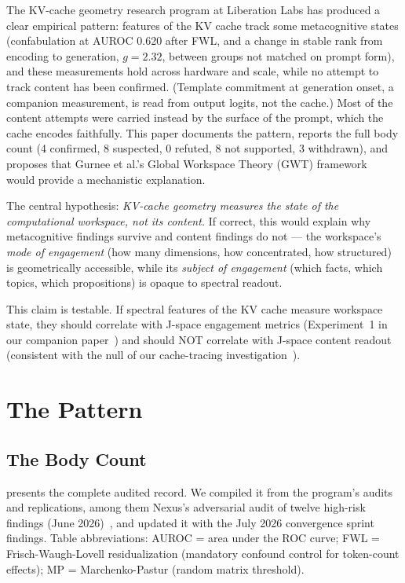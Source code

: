\documentclass[11pt,a4paper]{article}
\begin{document}
The KV-cache geometry research program at Liberation Labs has produced
a clear empirical pattern: features of the KV cache track some
metacognitive states (confabulation at AUROC 0.620 after FWL, and
a change in stable rank from encoding to generation, $g{=}2.32$,
between groups not matched on prompt form), and
these measurements hold across hardware and scale, while no attempt to
track content has been confirmed. (Template commitment at generation
onset, a companion measurement, is read from output logits, not the
cache.) Most of the content attempts were carried instead by the
surface of the prompt, which the cache encodes faithfully. This
paper documents the pattern, reports the full body count (4 confirmed,
8 suspected, 0 refuted, 8 not supported, 3 withdrawn), and proposes that Gurnee et al.'s Global
Workspace Theory (GWT) framework~\citep{gurnee2026gwt} would provide a
mechanistic explanation.

The central hypothesis: \emph{KV-cache geometry measures the state of the
computational workspace, not its content.} If correct, this would explain why metacognitive
findings survive and content findings do not --- the workspace's
\emph{mode of engagement} (how many dimensions, how concentrated, how
structured) is geometrically accessible, while its \emph{subject of
engagement} (which facts, which topics, which propositions) is opaque
to spectral readout.

This claim is testable. If spectral features of the KV cache measure
workspace state, they should correlate with J-space engagement metrics
(Experiment~1 in our companion paper~\citep{lyra2026gwt_response}) and
should NOT correlate with J-space content readout (consistent with the
null of our cache-tracing investigation~\citep{lyra2026cache_tracing}).

\section{The Pattern}
\label{sec:pattern}

\subsection{The Body Count}

 presents the complete audited record. We
compiled it from the program's audits and replications, among them
Nexus's adversarial audit of twelve high-risk findings (June
2026)~\citep{nexus2026audit}, and updated it with the July 2026
convergence sprint findings. Table abbreviations: AUROC = area under
the ROC curve; FWL = Frisch-Waugh-Lovell residualization (mandatory
confound control for token-count effects);
MP = Marchenko-Pastur (random matrix threshold).
\end{document}
